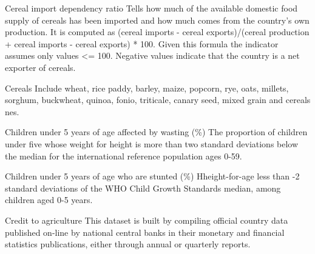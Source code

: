 \begin{MetadataCollection} {}
\begin{metadata}{Cereal import dependency ratio} {}
Tells how much of the available domestic food supply of cereals has been imported and how much comes from the country's own production. It is computed as (cereal imports - cereal exports)/(cereal production + cereal imports - cereal exports) * 100. Given this formula the indicator assumes only values <= 100. Negative values indicate that the country is a net exporter of cereals.
\end{metadata}

\begin{metadata}{Cereals} {}
Include wheat, rice paddy, barley, maize, popcorn, rye, oats, millets, sorghum, buckwheat, quinoa, fonio, triticale, canary seed, mixed grain and cereals nes.
\end{metadata}

\begin{metadata}{Children under 5 years of age affected by wasting (\%)} {}
The proportion of children under five whose weight for height is more than two standard deviations below the median for the international reference population ages 0-59.
\end{metadata}

\begin{metadata}{Children under 5 years of age who are stunted (\%)} {}
Hheight-for-age less than -2 standard deviations of the WHO Child Growth Standards median, among children aged 0-5 years.
\end{metadata}

\begin{metadata}{Credit to agriculture} {}
This dataset is built by compiling official country data published on-line by national central banks in their monetary and financial statistics publications, either through annual or quarterly reports.
\end{metadata}


\end{MetadataCollection}

